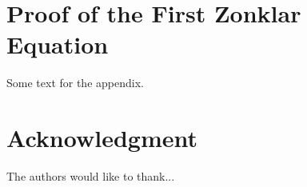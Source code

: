\documentclass[journal]{IEEEtran}
\begin{document}

%


\appendices
\section{Proof of the First Zonklar Equation}
Some text for the appendix.

\section*{Acknowledgment}


The authors would like to thank...


\ifCLASSOPTIONcaptionsoff
  \newpage
\fi





%
%
%
\end{document}
